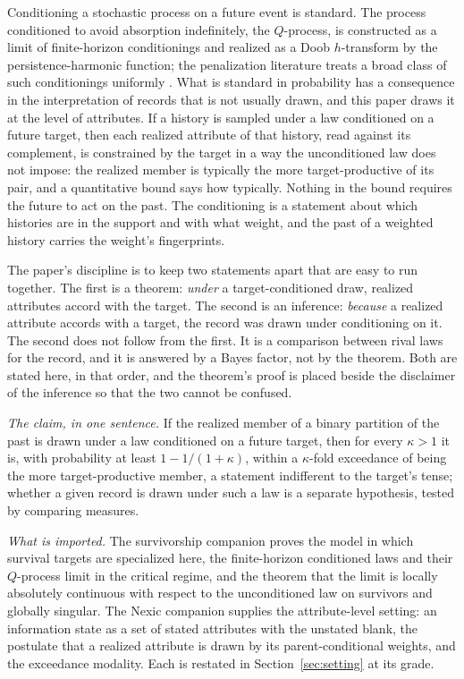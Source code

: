 \documentclass[11pt]{article}
\theoremstyle{plain}
\theoremstyle{definition}
\theoremstyle{remark}
\begin{document}
Conditioning a stochastic process on a future event is standard. The
process conditioned to avoid absorption indefinitely, the $Q$-process, is
constructed as a limit of finite-horizon conditionings and realized as a
Doob $h$-transform by the persistence-harmonic function; the penalization
literature treats a broad class of such conditionings uniformly
\cite{RVY06,MV12,CV16}. What is standard in probability has a
consequence in the interpretation of records that is not usually drawn,
and this paper draws it at the level of attributes. If a history is
sampled under a law conditioned on a future target, then each realized
attribute of that history, read against its complement, is constrained by
the target in a way the unconditioned law does not impose: the realized
member is typically the more target-productive of its pair, and a
quantitative bound says how typically. Nothing in the bound requires the
future to act on the past. The conditioning is a statement about which
histories are in the support and with what weight, and the past of a
weighted history carries the weight's fingerprints.

The paper's discipline is to keep two statements apart that are easy to
run together. The first is a theorem: \emph{under} a target-conditioned
draw, realized attributes accord with the target. The second is an
inference: \emph{because} a realized attribute accords with a target, the
record was drawn under conditioning on it. The second does not follow
from the first. It is a comparison between rival laws for the record, and
it is answered by a Bayes factor, not by the theorem. Both are stated
here, in that order, and the theorem's proof is placed beside the
disclaimer of the inference so that the two cannot be confused.

\emph{The claim, in one sentence.} If the realized member of a binary
partition of the past is drawn under a law conditioned on a future
target, then for every $\kappa>1$ it is, with probability at least
$1-1/(1+\kappa)$, within a $\kappa$-fold exceedance of being the more
target-productive member, a statement indifferent to the target's tense;
whether a given record is drawn under such a law is a separate hypothesis,
tested by comparing measures.

\emph{What is imported.} The survivorship companion \cite{SurvA} proves
the model in which survival targets are specialized here, the
finite-horizon conditioned laws and their $Q$-process limit in the
critical regime, and the theorem that the limit is locally absolutely
continuous with respect to the unconditioned law on survivors and
globally singular. The Nexic companion \cite{Nexus} supplies the
attribute-level setting: an information state as a set of stated
attributes with the unstated blank, the postulate that a realized
attribute is drawn by its parent-conditional weights, and the exceedance
modality. Each is restated in Section~\ref{sec:setting} at its grade.
\end{document}

